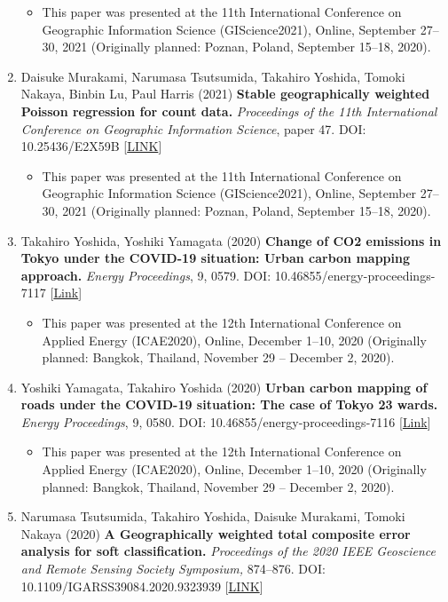 \documentclass[
]{book}
\providecommand{\tightlist}{%
  \setlength{\itemsep}{0pt}\setlength{\parskip}{0pt}}
\begin{document}
\begin{enumerate}
  \begin{itemize}
  \tightlist
  \item
    This paper was presented at the 11th International Conference on Geographic Information Science (GIScience2021), Online, September 27--30, 2021 (Originally planned: Poznan, Poland, September 15--18, 2020).
  \end{itemize}
\item
  Daisuke Murakami, Narumasa Tsutsumida, Takahiro Yoshida, Tomoki Nakaya, Binbin Lu, Paul Harris (2021)
  \textbf{Stable geographically weighted Poisson regression for count data.}
  \emph{Proceedings of the 11th International Conference on Geographic Information Science}, paper 47.
  DOI: 10.25436/E2X59B {[}\href{https://escholarship.org/uc/item/8kg664zg}{LINK}{]}

  \begin{itemize}
  \tightlist
  \item
    This paper was presented at the 11th International Conference on Geographic Information Science (GIScience2021), Online, September 27--30, 2021 (Originally planned: Poznan, Poland, September 15--18, 2020).
  \end{itemize}
\item
  Takahiro Yoshida, Yoshiki Yamagata (2020)
  \textbf{Change of CO2 emissions in Tokyo under the COVID-19 situation: Urban carbon mapping approach.}
  \emph{Energy Proceedings}, 9, 0579.
  DOI: 10.46855/energy-proceedings-7117 {[}\href{https://doi.org/10.46855/energy-proceedings-7117}{Link}{]}

  \begin{itemize}
  \tightlist
  \item
    This paper was presented at the 12th International Conference on Applied Energy (ICAE2020), Online, December 1--10, 2020 (Originally planned: Bangkok, Thailand, November 29 -- December 2, 2020).
  \end{itemize}
\item
  Yoshiki Yamagata, Takahiro Yoshida (2020)
  \textbf{Urban carbon mapping of roads under the COVID-19 situation: The case of Tokyo 23 wards.}
  \emph{Energy Proceedings}, 9, 0580.
  DOI: 10.46855/energy-proceedings-7116 {[}\href{https://doi.org/10.46855/energy-proceedings-7116}{Link}{]}

  \begin{itemize}
  \tightlist
  \item
    This paper was presented at the 12th International Conference on Applied Energy (ICAE2020), Online, December 1--10, 2020 (Originally planned: Bangkok, Thailand, November 29 -- December 2, 2020).
  \end{itemize}
\item
  Narumasa Tsutsumida, Takahiro Yoshida, Daisuke Murakami, Tomoki Nakaya (2020)
  \textbf{A Geographically weighted total composite error analysis for soft classification.}
  \emph{Proceedings of the 2020 IEEE Geoscience and Remote Sensing Society Symposium,} 874--876.
  DOI: 10.1109/IGARSS39084.2020.9323939 {[}\href{https://ieeexplore.ieee.org/document/9323939}{LINK}{]}


\end{enumerate}
\end{document}
